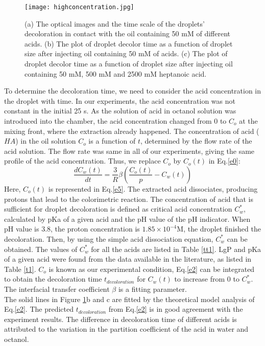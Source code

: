 \documentclass[journal=langd5,manuscript=article]{achemso}
\begin{document}
\begin{figure}[htp]
	\texttt{[image: highconcentration.jpg]}
	\caption{ (a) The optical images and the time scale of the droplets' decoloration in contact with the oil containing 50 mM of different acids. (b)  The plot of droplet decolor time as a function of droplet size after injecting oil containing 50 mM of acids. (c) The plot of droplet decolor time as a function of droplet size after injecting oil containing 50 mM, 500 mM and 2500 mM heptanoic acid. }
	\label{highconc}
\end{figure}
To determine the decoloration time, we need to consider the acid concentration in the droplet with time. In our experiments, the acid concentration was not constant in the initial 25 s. As the solution of acid in octanol solution was introduced into the chamber, the acid concentration changed from 0 to $C_o$ at the mixing front, where the extraction already happened. The concentration of acid ($HA$) in the oil solution $C_{o}$ is a function of $t$, determined by the flow rate of the acid solution. The flow rate was same in all of our experiments, giving the same profile of the acid concentration. Thus, we replace $C_{o}$ by $C_{o}(t)$ in Eq.\ref{e0}:
\begin{equation}
\frac{dC_w(t)}{dt}=\frac{3}{R}{\beta}(\frac{C_o(t)}{p}-C_w(t))
\label{e2}
\end{equation}
Here, $C_{o}(t)$ is represented in Eq.\ref{e5}. The extracted acid dissociates, producing protons that lead to the colorimetric reaction. The concentration of acid that is sufficient for droplet decoloration is defined as critical acid concentration $C^*_w$, calculated by pKa of a given acid and the pH value of the pH indicator.\cite{wei2020integrated} When pH value is 3.8, the proton concentration is $1.85 \times 10^{-4}$M, the droplet finished the decoloration. Then, by using the simple acid dissociation equation, $C^*_w$ can be obtained. The values of $C^*_w$ for all the acids are listed in Table \ref{tt1}. LgP and pKa of a given acid were found from the data available in the literature, as listed in Table \ref{t1}. $C_o$ is known as our experimental condition, Eq.\ref{e2} can be integrated to obtain the decoloration time $t_{decoloration}$ for $C_w(t)$ to increase from 0 to $C_w^*$. The interfacial transfer coefficient $\beta$ is a fitting parameter.\\
The solid lines in Figure \ref{highconc}b and c are fitted by the theoretical model analysis of Eq.\ref{e2}. The predicted $t_{decoloration}$ from Eq.\ref{e2} is in good agreement with the experiment results. The difference in decoloration time of different acids is attributed to the variation in the partition coefficient of the acid in water and octanol.\\
\end{document}
